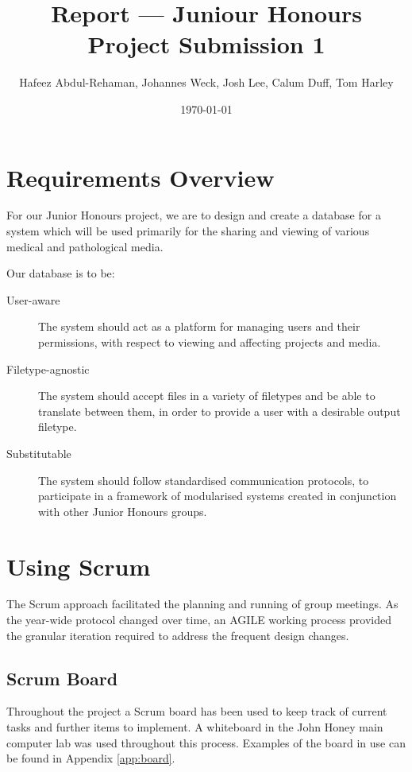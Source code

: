 \documentclass{article}
\begin{document}
\title{Report --- Juniour Honours Project Submission 1}
\author{Hafeez Abdul-Rehaman, Johannes Weck, Josh Lee, Calum Duff, Tom Harley}
\date{\today}

\maketitle

\tableofcontents

\section{Requirements Overview}
For our Junior Honours project, we are to design and create a database
for a system which will be used primarily for the sharing and viewing
of various medical and pathological media.

Our database is to be:
\begin{description}
  \item[User-aware] The system should act as a platform for managing
    users and their permissions, with respect to viewing and affecting
    projects and media.
  \item[Filetype-agnostic] The system should accept files in a
    variety of filetypes and be able to translate between them, in order to
    provide a user with a desirable output filetype.
  \item[Substitutable] The system should follow standardised
    communication protocols, to participate in a framework of modularised
    systems created in conjunction with other Junior Honours groups.
\end{description}

\section{Using Scrum}
The Scrum approach facilitated the
planning and running of group meetings. As the year-wide protocol changed
over time, an AGILE working process provided the granular iteration
required to address the frequent design changes.

\subsection{Scrum Board}
Throughout the project a Scrum board has been used to keep track of current tasks
and further items to implement. A whiteboard in the John Honey main computer lab
was used throughout this process. Examples of the board in use can be found in
Appendix \ref{app:board}.
\end{document}
